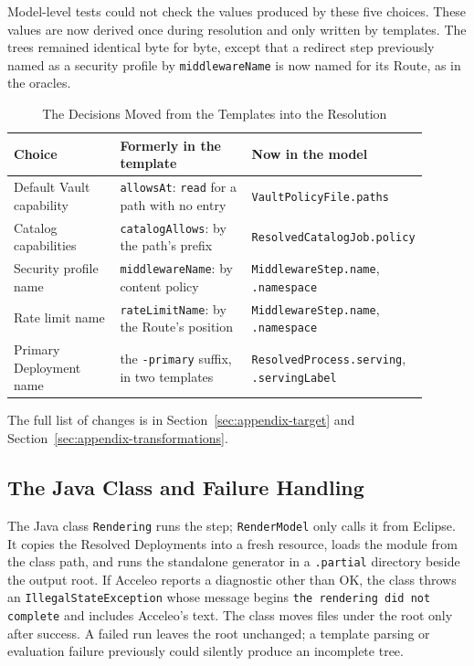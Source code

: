 Model-level tests could not check the values produced by these five choices.
These values are now derived once during resolution and only written by templates.
The trees remained identical byte for byte, except that a redirect step previously
named as a security profile by \texttt{middlewareName} is now named for its Route, as
in the oracles.

\begin{table}[!htbp]
\centering
\small
\begin{tabular}{>{\raggedright\arraybackslash}p{0.27\linewidth}>{\raggedright\arraybackslash}p{0.33\linewidth}>{\raggedright\arraybackslash}p{0.3\linewidth}}
\hline
\textbf{Choice} & \textbf{Formerly in the template} & \textbf{Now in the model} \\
\hline
Default Vault capability & \texttt{allowsAt}: \texttt{read} for a path with no entry & \texttt{VaultPolicyFile.paths} \\
Catalog capabilities & \texttt{catalogAllows}: by the path's prefix & \texttt{ResolvedCatalogJob.policy} \\
Security profile name & \texttt{middlewareName}: by content policy & \texttt{MiddlewareStep.name}, \texttt{.namespace} \\
Rate limit name & \texttt{rateLimitName}: by the Route's position & \texttt{MiddlewareStep.name}, \texttt{.namespace} \\
Primary Deployment name & the \texttt{-primary} suffix, in two templates & \texttt{ResolvedProcess.serving}, \texttt{.servingLabel} \\
\hline
\end{tabular}
\caption{The Decisions Moved from the Templates into the Resolution}
\label{tab:moved-choices}
\end{table}

The full list of changes is in Section~\ref{sec:appendix-target} and
Section~\ref{sec:appendix-transformations}.

\subsection{The Java Class and Failure Handling}
\label{sec:m2t-java}

The Java class \texttt{Rendering} runs the step; \texttt{RenderModel} only calls it from Eclipse. It copies the Resolved
Deployments into a fresh resource, loads the module from the class path, and runs the
standalone generator in a \texttt{.partial} directory beside the output root. If Acceleo
reports a diagnostic other than OK, the class throws an \texttt{IllegalStateException} whose message begins
\texttt{the rendering did not complete} and includes Acceleo's text. The class moves files under the root
only after success. A failed run leaves the root unchanged; a template parsing or
evaluation failure previously could silently produce an incomplete tree.


